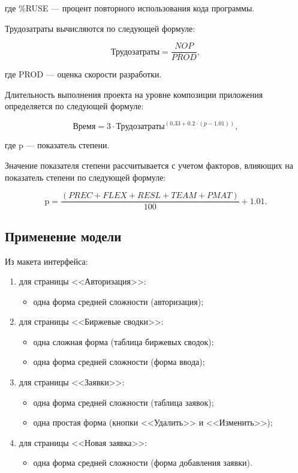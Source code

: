 \documentclass{bmstu}
\begin{document}
где \%RUSE --- процент повторного использования кода программы.

Трудозатраты вычисляются по следующей формуле:

\begin{equation}
    \text{Трудозатраты} = \frac{NOP}{PROD},
\end{equation}

где PROD --- оценка скорости разработки.

Длительность выполнения проекта на уровне композиции приложения определяется по следующей формуле:

\begin{equation}
    \text{Время} = 3 \cdot \text{Трудозатраты}^{(0.33 + 0.2 \cdot (p - 1.01))},
\end{equation}

где p --- показатель степени. 

Значение показателя степени рассчитывается с учетом факторов, влияющих на показатель степени по следующей формуле:

\begin{equation}
    \text{p} = \frac{(PREC + FLEX + RESL + TEAM + PMAT)}{100} + 1.01.
\end{equation}

\subsection*{Применение модели}

Из макета интерфейса:

\begin{enumerate}
    \item для страницы <<Авторизация>>:
        \begin{itemize}
            \item одна форма средней сложности (авторизация);
        \end{itemize}
    \item для страницы <<Биржевые сводки>>:
        \begin{itemize}
            \item одна сложная форма (таблица биржевых сводок);
            \item одна форма средней сложности (форма ввода);
        \end{itemize}
    \item для страницы <<Заявки>>:
        \begin{itemize}
            \item одна форма средней сложности (таблица заявок);
            \item одна простая форма (кнопки <<Удалить>> и <<Изменить>>);
        \end{itemize}
    \item для страницы <<Новая заявка>>:
        \begin{itemize}
            \item одна форма средней сложности (форма добавления заявки).
        \end{itemize}
\end{enumerate}
\end{document}
